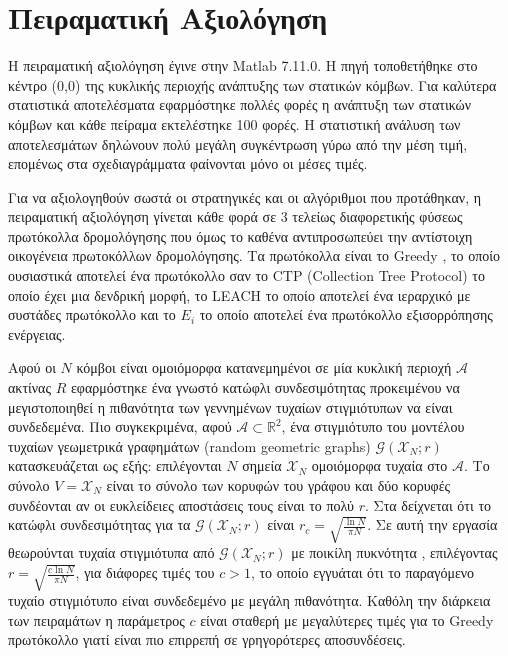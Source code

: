 

\chapter{Πειραματική Αξιολόγηση}\label{ch:results}
Η πειραματική αξιολόγηση έγινε στην Matlab 7.11.0. Η πηγή τοποθετήθηκε στο κέντρο (0,0) της κυκλικής περιοχής ανάπτυξης των στατικών κόμβων. Για καλύτερα στατιστικά
αποτελέσματα εφαρμόστηκε πολλές φορές η ανάπτυξη των στατικών κόμβων και κάθε πείραμα εκτελέστηκε 100 φορές. Η στατιστική ανάλυση των αποτελεσμάτων δηλώνουν
πολύ μεγάλη συγκέντρωση γύρω από την μέση τιμή, επομένως στα σχεδιαγράμματα φαίνονται μόνο οι μέσες τιμές.

Για να αξιολογηθούν σωστά οι στρατηγικές και οι αλγόριθμοι που προτάθηκαν, η πειραματική αξιολόγηση γίνεται κάθε φορά σε 3 τελείως διαφορετικής φύσεως πρωτόκολλα
δρομολόγησης που όμως το καθένα αντιπροσωπεύει την αντίστοιχη οικογένεια πρωτοκόλλων δρομολόγησης. Τα πρωτόκολλα είναι το Greedy \cite{greedy_protocol}, το οποίο
ουσιαστικά αποτελεί ένα πρωτόκολλο σαν το CTP (Collection Tree Protocol) το οποίο έχει μια δενδρική μορφή, το LEACH \cite{leach_protocol} το οποίο αποτελεί ένα
ιεραρχικό με συστάδες πρωτόκολλο και το $E_{i}$ \cite{debp_protocol} το οποίο αποτελεί ένα πρωτόκολλο εξισορρόπησης ενέργειας.

Αφού οι $N$ κόμβοι είναι ομοιόμορφα κατανεμημένοι σε μία κυκλική περιοχή $\mathcal{A}$ ακτίνας $R$ εφαρμόστηκε ένα γνωστό κατώφλι συνδεσιμότητας προκειμένου να
μεγιστοποιηθεί η πιθανότητα των γεννημένων τυχαίων στιγμιότυπων να είναι συνδεδεμένα. Πιο συγκεκριμένα, αφού $\mathcal{A}\subset \mathbb{R}^2$, ένα στιγμιότυπο του
μοντέλου τυχαίων γεωμετρικά γραφημάτων (random geometric graphs) $\mathcal{G}(\mathcal{X}_N;r)$ κατασκευάζεται ως εξής: επιλέγονται $N$ σημεία $\mathcal{X}_N$
ομοιόμορφα τυχαία στο $\mathcal{A}$. Το σύνολο $V = \mathcal{X}_N$  είναι το σύνολο των κορυφών του γράφου και δύο κορυφές συνδέονται αν οι ευκλείδειες αποστάσεις
τους είναι το πολύ $r$. Στα \cite{rg1,rg2} δείχνεται ότι το κατώφλι συνδεσιμότητας για τα $\mathcal{G}(\mathcal{X}_N;r)$ είναι $r_c = \sqrt{\frac{\ln N}{\pi N}}$. Σε
αυτή την εργασία θεωρούνται τυχαία στιγμιότυπα από $\mathcal{G}(\mathcal{X}_N;r)$ με ποικίλη πυκνότητα , επιλέγοντας $r = \sqrt{\frac{c\ln N}{\pi N}}$, για διάφορες
τιμές του $c>1$, το οποίο εγγυάται ότι το παραγόμενο τυχαίο στιγμιότυπο είναι συνδεδεμένο με μεγάλη πιθανότητα. Καθόλη την διάρκεια των πειραμάτων η παράμετρος $c$
είναι σταθερή με μεγαλύτερες τιμές για το Greedy πρωτόκολλο γιατί είναι πιο επιρρεπή σε γρηγορότερες αποσυνδέσεις.

